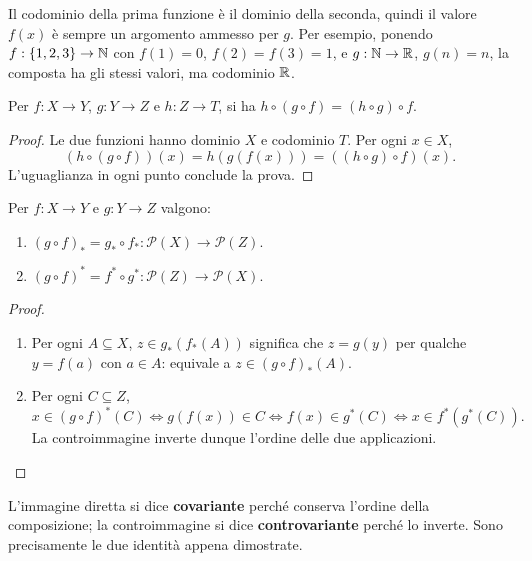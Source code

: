 Il codominio della prima funzione è il dominio della seconda, quindi il valore $f(x)$ è sempre un argomento ammesso per $g$. Per esempio, ponendo $f:\{1,2,3\}\to\mathbb{N}$ con $f(1)=0$, $f(2)=f(3)=1$, e $g:\mathbb{N}\to\mathbb{R}$, $g(n)=n$, la composta ha gli stessi valori, ma codominio $\mathbb{R}$.

\begin{proposizione}[Associatività]
Per $f:X\to Y$, $g:Y\to Z$ e $h:Z\to T$, si ha $h\circ(g\circ f)=(h\circ g)\circ f$.
\end{proposizione}
\begin{proof}
Le due funzioni hanno dominio $X$ e codominio $T$. Per ogni $x\in X$,
\[
(h\circ(g\circ f))(x)=h(g(f(x)))=((h\circ g)\circ f)(x).
\]
L'uguaglianza in ogni punto conclude la prova.
\end{proof}

\begin{proposizione}
Per $f:X\to Y$ e $g:Y\to Z$ valgono:
\begin{enumerate}[label=\arabic*.]
\item $(g\circ f)_*=g_*\circ f_*:\mathcal P(X)\to\mathcal P(Z)$.
\item $(g\circ f)^*=f^*\circ g^*:\mathcal P(Z)\to\mathcal P(X)$.
\end{enumerate}
\end{proposizione}
\begin{proof}
\begin{enumerate}[label=\arabic*.]
\item Per ogni $A\subseteq X$, $z\in g_*(f_*(A))$ significa che $z=g(y)$ per qualche $y=f(a)$ con $a\in A$: equivale a $z\in(g\circ f)_*(A)$.
\item Per ogni $C\subseteq Z$,
\[
x\in(g\circ f)^*(C)\iff g(f(x))\in C
\iff f(x)\in g^*(C)\iff x\in f^*(g^*(C)).
\]
La controimmagine inverte dunque l'ordine delle due applicazioni.
\end{enumerate}
\end{proof}

L'immagine diretta si dice \textbf{covariante} perché conserva l'ordine della composizione; la controimmagine si dice \textbf{controvariante} perché lo inverte. Sono precisamente le due identità appena dimostrate.

